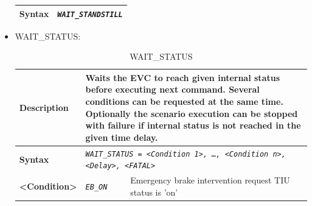 \documentclass{template/openetcs}
\begin{document}
\begin{itemize}
\begin{longtable}{|l|l|}
			\hline
						
				\begin{minipage}[t]{0.22\linewidth} \textbf{Syntax}	\end{minipage}
			&	\begin{minipage}[t]{0.78\linewidth} \emph{\texttt{WAIT\_STANDSTILL}} \end{minipage} \\
			
			\hline\hline
			
		\end{longtable}
		
	\item WAIT\_STATUS:
		\begin{longtable}{|l|l|l|}
			\caption{WAIT\_STATUS}\\ 
			\hline

				\begin{minipage}[t]{0.22\linewidth} \textbf{Description} \end{minipage} 
			&	\multicolumn{2}{l|}{ \begin{minipage}[t]{0.78\linewidth} Waits the EVC to reach given internal status before executing next command. Several conditions can be requested at the same time. Optionally the scenario execution can be stopped with failure if internal status is not reached in the given time delay. \end{minipage} } \\
			
			\hline
						
				\begin{minipage}[t]{0.22\linewidth} \textbf{Syntax}	\end{minipage}
			&	\multicolumn{2}{l|}{ \begin{minipage}[t]{0.78\linewidth} \emph{\texttt{WAIT\_STATUS = <Condition 1>, …, <Condition n>, <Delay>, <FATAL>}} \end{minipage} } \\
			
			\hline
			
				\multirow{1}{*}{ \begin{minipage}[t]{0.22\linewidth} \textbf{<Condition>} \end{minipage} }
			&	\begin{minipage}[t]{0.40\linewidth} \emph{\texttt{EB\_ON}} \end{minipage}
			&	\begin{minipage}[t]{0.38\linewidth} Emergency brake intervention request TIU status is ’on’ \end{minipage} \\
			

\end{longtable}
\end{itemize}
\end{document}
